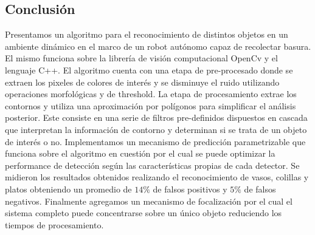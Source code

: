 \subsection{Conclusi\'on}
Presentamos un algoritmo para el reconocimiento de distintos objetos en 
un ambiente dinámico en el marco de un robot autónomo capaz de 
recolectar basura. El mismo funciona sobre la librería de visión 
computacional OpenCv y el lenguaje C++.  El algoritmo cuenta
con una etapa de pre-procesado donde se extraen los pixeles de colores de interés y se disminuye el ruido utilizando 
operaciones morfológicas y de threshold. La etapa de procesamiento extrae los contornos y utiliza una aproximación por polígonos
para simplificar el análisis posterior. Este consiste en una serie de 
filtros pre-definidos dispuestos en cascada que interpretan la 
información de contorno y  determinan si se trata 
de un objeto de interés o no. 
Implementamos un mecanismo de predicción parametrizable que funciona 
sobre el algoritmo en cuestión por el cual se puede optimizar la performance de 
detección según las características propias de cada detector. Se 
midieron los resultados obtenidos realizando el reconocimiento de 
vasos, colillas y platos obteniendo un promedio de $14\%$ de falsos 
positivos  y $5\%$ de falsos negativos. Finalmente agregamos un mecanismo de focalización por el cual 
el sistema completo puede concentrarse sobre un único objeto reduciendo 
los tiempos de procesamiento. 



